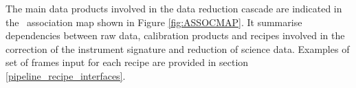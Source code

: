 


The main data products involved in the data reduction cascade are indicated 
in the \instname\, association map shown in Figure \ref{fig:ASSOCMAP}. It summarise 
dependencies between raw data, calibration products and recipes involved in 
the correction of the instrument signature and reduction of science data. 
Examples of set of frames input for each recipe are provided in section 
\ref{pipeline_recipe_interfaces}.













    


